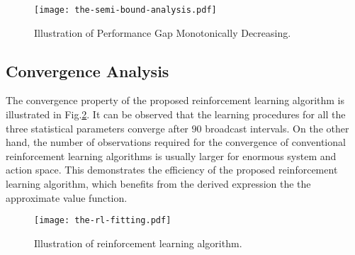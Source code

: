 \begin{figure}[ht!]                                                                             %
    \centering                                                                                  %
    \texttt{[image: the-semi-bound-analysis.pdf]}                     %
    \caption{Illustration of Performance Gap Monotonically Decreasing.}
    \label{fig:semi-bound}                                                                %
\end{figure}                                                                                    %

\subsection{Convergence Analysis}
\label{subsec:converge}
The convergence property of the proposed reinforcement learning algorithm is illustrated in Fig.\ref{fig:rl_plot}.
It can be observed that the learning procedures for all the three statistical parameters converge after $90$ broadcast intervals.
On the other hand, the number of observations required for the convergence of conventional reinforcement learning algorithms is usually larger for enormous system and action space.
This demonstrates the efficiency of the proposed reinforcement learning algorithm, which benefits from the derived expression the the approximate value function.
\begin{figure}[ht!]
    \centering
    \texttt{[image: the-rl-fitting.pdf]}
    \caption{Illustration of reinforcement learning algorithm.} 
    \label{fig:rl_plot}
\end{figure}

